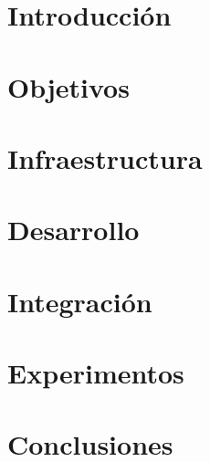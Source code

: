 \documentclass[a4paper, 12pt]{book}
\begin{document}
\cleardoublepage


\cleardoublepage
\pagestyle{plain}
\chapter{Introducción}


\cleardoublepage
\chapter{Objetivos}


\cleardoublepage
\chapter{Infraestructura}


\cleardoublepage
\chapter{Desarrollo}


\cleardoublepage
\chapter{Integración}


\cleardoublepage
\chapter{Experimentos}


\cleardoublepage
\chapter{Conclusiones}


\cleardoublepage
\end{document}
